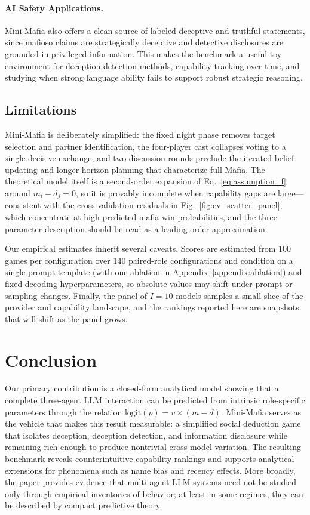 \documentclass[sigconf]{aamas}
\begin{document}
\paragraph{AI Safety Applications.} Mini-Mafia also offers a clean source of labeled deceptive and truthful statements, since mafioso claims are strategically deceptive and detective disclosures are grounded in privileged information. This makes the benchmark a useful toy environment for deception-detection methods, capability tracking over time, and studying when strong language ability fails to support robust strategic reasoning.

\subsection{Limitations}
\label{sec:limitations}

Mini-Mafia is deliberately simplified: the fixed night phase removes target selection and partner identification, the four-player cast collapses voting to a single decisive exchange, and two discussion rounds preclude the iterated belief updating and longer-horizon planning that characterize full Mafia. The theoretical model itself is a second-order expansion of Eq.~\eqref{eq:assumption_f} around $m_i - d_j = 0$, so it is provably incomplete when capability gaps are large---consistent with the cross-validation residuals in Fig.~\ref{fig:cv_scatter_panel}, which concentrate at high predicted mafia win probabilities, and the three-parameter description should be read as a leading-order approximation.

Our empirical estimates inherit several caveats. Scores are estimated from $100$ games per configuration over $140$ paired-role configurations and condition on a single prompt template (with one ablation in Appendix~\ref{appendix:ablation}) and fixed decoding hyperparameters, so absolute values may shift under prompt or sampling changes. Finally, the panel of $I=10$ models samples a small slice of the provider and capability landscape, and the rankings reported here are snapshots that will shift as the panel grows.

\section{Conclusion}

Our primary contribution is a closed-form analytical model showing that a complete three-agent LLM interaction can be predicted from intrinsic role-specific parameters through the relation $\text{logit}(p) = v \times (m - d)$. Mini-Mafia serves as the vehicle that makes this result measurable: a simplified social deduction game that isolates deception, deception detection, and information disclosure while remaining rich enough to produce nontrivial cross-model variation. The resulting benchmark reveals counterintuitive capability rankings and supports analytical extensions for phenomena such as name bias and recency effects. More broadly, the paper provides evidence that multi-agent LLM systems need not be studied only through empirical inventories of behavior; at least in some regimes, they can be described by compact predictive theory.
\end{document}
